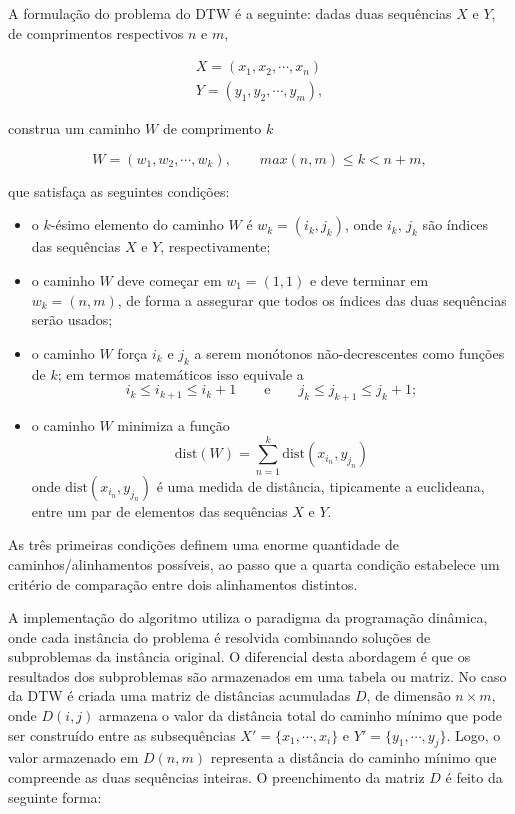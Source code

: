 \newcommand{\dist}{\mbox{dist}}

A formulação do problema \citep{salvador2007toward} do DTW é a seguinte: dadas duas sequências $X$ e $Y$, de comprimentos respectivos $n$ e $m$,

\begin{align*}
    X = (x_1, x_2, \cdots, x_n) \\
    Y = (y_1, y_2, \cdots, y_m),
\end{align*}

construa um caminho $W$ de comprimento $k$

\begin{equation*}
    W = (w_1, w_2, \cdots, w_k), \qquad max(n, m) \leq k < n + m,
\end{equation*}

\noindent que satisfaça as seguintes condições:

\begin{itemize}
\item o $k$-ésimo elemento do caminho $W$ é $w_k = (i_k, j_k)$, onde $i_k$, $j_k$ são índices das sequências $X$ e $Y$, respectivamente;
\item o caminho $W$ deve começar em $w_1 = (1, 1)$ e deve terminar em $w_k = (n, m)$, de forma a assegurar que todos os índices das duas sequências serão usados;
\item o caminho $W$ força $i_k$ e $j_k$ a serem monótonos não-decrescentes como funções de $k$; em termos matemáticos isso equivale a
\begin{equation*}
    i_k \leq i_{k+1} \leq i_k + 1 \qquad \mbox{e} \qquad j_k\leq j_{k+1} \leq j_k + 1;
\end{equation*}
\item o caminho $W$ minimiza a função 
\begin{equation*}
    \dist(W) = \sum_{n=1}^{k} \dist(x_{i_n}, y_{j_n})
\end{equation*}
onde $\dist(x_{i_n}, y_{j_n})$ é uma medida de distância, tipicamente a euclideana, entre um par de elementos das sequências $X$ e $Y$.
\end{itemize}

As três primeiras condições definem uma enorme quantidade de caminhos/alinhamentos possíveis, ao passo que a quarta condição estabelece um critério de comparação entre dois alinhamentos distintos.

A implementação do algoritmo utiliza o paradigma da programação dinâmica, onde cada instância do problema é resolvida combinando soluções de subproblemas da instância original. O diferencial desta abordagem é que os resultados dos subproblemas são armazenados em uma tabela ou matriz. No caso da DTW é criada uma matriz de distâncias acumuladas $D$, de dimensão $n \times m$, onde $D(i, j)$ armazena o valor da distância total do caminho mínimo que pode ser construído entre as subsequências $X' = \{x_1, \cdots, x_i\}$ e $Y' = \{y_1, \cdots, y_j\}$. Logo, o valor armazenado em $D(n, m)$ representa a distância do caminho mínimo que compreende as duas sequências inteiras. O preenchimento da matriz $D$ é feito da seguinte forma:

